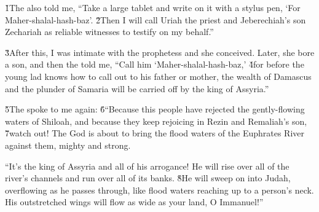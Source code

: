 \v{1}The  also told me, ``Take a large tablet and write on it with a stylus pen, `For Maher-shalal-hash-baz'. \v{2}Then I will call Uriah the priest and Jeberechiah's son Zechariah as reliable witnesses to testify on my behalf.''

\v{3}After this, I was intimate with the prophetess and she conceived. Later, she bore a son, and then the  told me, ``Call him `Maher-shalal-hash-baz,' \v{4}for before the young lad knows how to call out to his father or mother, the wealth of Damascus and the plunder of Samaria will be carried off by the king of Assyria.''

\v{5}The  spoke to me again: \v{6}``Because this people have rejected the gently-flowing waters of Shiloah, and because they keep rejoicing in Rezin and Remaliah's son, \v{7}watch out! The  God is about to bring the flood waters of the Euphrates River against them, mighty and strong.

``It's the king of Assyria and all of his arrogance! He will rise over all of the river's channels and run over all of its banks. \v{8}He will sweep on into Judah, overflowing as he passes through, like flood waters reaching up to a person's neck. His outstretched wings will flow as wide as your land, O Immanuel!''

